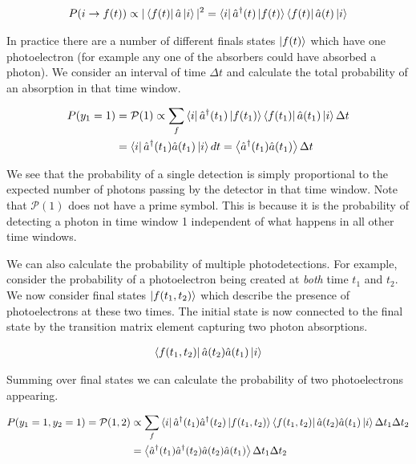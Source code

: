 \documentclass[12pt]{article}
\begin{document}
\begin{align}
P(i \rightarrow f(t)) \propto |\bra{f(t)}\hat{a}\ket{i}|^2 = \bra{i} \hat{a}^{\dag}(t) \ket{f(t)}\bra{f(t)}\hat{a}(t)\ket{i}
\end{align}

In practice there are a number of different finals states $\ket{f(t)}$ which have one photoelectron (for example any one of the absorbers could have absorbed a photon). We consider an interval of time $\Delta t$ and calculate the total probability of an absorption in that time window.

\begin{align}
P(y_{1}=1) &= \mathcal{P}(1) \propto \sum_f \bra{i} \hat{a}^{\dag}(t_{1})\ket{f(t_{1})}\bra{f(t_{1})}\hat{a}(t_{1}) \ket{i}\Delta t\\
&= \bra{i} \hat{a}^{\dag}(t_{1}) \hat{a}(t_{1}) \ket{i}dt = \Braket{\hat{a}^{\dag}(t_1) \hat{a}(t_1)}\Delta t
\end{align}

We see that the probability of a single detection is simply proportional to the expected number of photons passing by the detector in that time window. Note that $\mathcal{P}(1)$ does not have a prime symbol. This is because it is the probability of detecting a photon in time window 1 independent of what happens in all other time windows.

We can also calculate the probability of multiple photodetections. For example, consider the probability of a photoelectron being created at \textit{both} time $t_1$ and $t_2$. We now consider final states $\ket{f(t_1,t_2)}$ which describe the presence of photoelectrons at these two times. The initial state is now connected to the final state by the transition matrix element capturing two photon absorptions.

\begin{align}
\bra{f(t_1,t_2)}\hat{a}(t_2)\hat{a}(t_1)\ket{i}
\end{align}

Summing over final states we can calculate the probability of two photoelectrons appearing.

\begin{align}
P(y_1=1,y_2=1) = \mathcal{P}(1,2) &\propto \sum_{f}\bra{i}\hat{a}^{\dag}(t_1)\hat{a}^{\dag}(t_2)\ket{f(t_1,t_2)}\bra{f(t_1,t_2)}\hat{a}(t_2)\hat{a}(t_1)\ket{i}\Delta t_1 \Delta t_2\\
&= \Braket{\hat{a}^{\dag}(t_1)\hat{a}^{\dag}(t_2)\hat{a}(t_2)\hat{a}(t_1)}\Delta t_1 \Delta t_2
\end{align}
\end{document}
